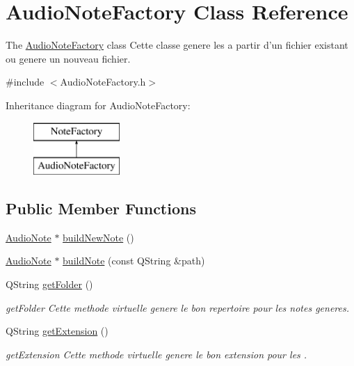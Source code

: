 \hypertarget{class_audio_note_factory}{\section{Audio\-Note\-Factory Class Reference}
\label{class_audio_note_factory}
}


The \hyperlink{class_audio_note_factory}{Audio\-Note\-Factory} class Cette classe genere les  a partir d'un fichier existant ou genere un nouveau fichier.  




{\ttfamily \#include $<$Audio\-Note\-Factory.\-h$>$}

Inheritance diagram for Audio\-Note\-Factory\-:\begin{figure}[H]
\begin{center}
\leavevmode
\includegraphics[height=2.000000cm]{class_audio_note_factory}
\end{center}
\end{figure}
\subsection*{Public Member Functions}
\begin{DoxyCompactItemize}
\item 
\hyperlink{class_audio_note}{Audio\-Note} $\ast$ \hyperlink{class_audio_note_factory_a1fc66fa57aaffff2a952dc18223135d2}{build\-New\-Note} ()
\item 
\hyperlink{class_audio_note}{Audio\-Note} $\ast$ \hyperlink{class_audio_note_factory_ab76e371b423655a9e09eb9319f20ab7e}{build\-Note} (const Q\-String \&path)
\item 
Q\-String \hyperlink{class_audio_note_factory_a90c0669aa411ea0d37a4a806028d13ff}{get\-Folder} ()
\begin{DoxyCompactList}\small\item\em get\-Folder Cette methode virtuelle genere le bon repertoire pour les notes generes. \end{DoxyCompactList}\item 
Q\-String \hyperlink{class_audio_note_factory_ad8d31f7a05a62979ff24b5bfa97ad686}{get\-Extension} ()
\begin{DoxyCompactList}\small\item\em get\-Extension Cette methode virtuelle genere le bon extension pour les . \end{DoxyCompactList}\end{DoxyCompactItemize}
